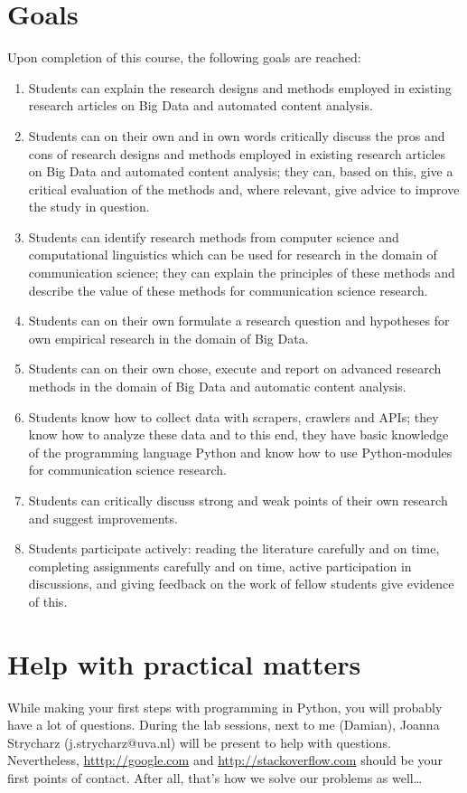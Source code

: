 \documentclass[a4paper,10pt]{report}
\begin{document}
\section{Goals}
Upon completion of this course, the following goals are reached:
\begin{enumerate}[A]
\item Students can explain the research designs and methods employed in existing research articles on Big Data and automated content analysis.
\item Students can on their own and in own words critically discuss the pros and cons of research designs and methods employed in existing research articles on Big Data and automated content analysis; they can, based on this, give a critical evaluation of the methods and, where relevant, give advice to improve the study in question.
\item Students can identify research methods from computer science and computational linguistics which can be used for research in the domain of communication science; they can explain the principles of these methods and describe the value of these methods for communication science research.
\item Students can on their own formulate a research question and hypotheses for own empirical research in the domain of Big Data.
\item Students can on their own chose, execute and report on advanced research methods in the domain of Big Data and automatic content analysis.
\item Students know how to collect data with scrapers, crawlers and APIs; they know how to analyze these data and to this end, they have basic knowledge of the programming language Python and know how to use Python-modules for communication science research.
\item Students can critically discuss strong and weak points of their own research and suggest improvements.
\item Students participate actively: reading the literature carefully and on time, completing assignments carefully and on time, active participation in discussions, and giving feedback on the work of fellow students give evidence of this.
\end{enumerate}

\section{Help with practical matters}
While making your first steps with programming in Python, you will probably have a lot of questions. During the lab sessions, next to me (Damian), Joanna Strycharz (j.strycharz@uva.nl) will be present to help with questions. 
Nevertheless, \url{htttp://google.com} and \url{http://stackoverflow.com} should be your first points of contact. After all, that's how we solve our problems as well\ldots
\end{document}
